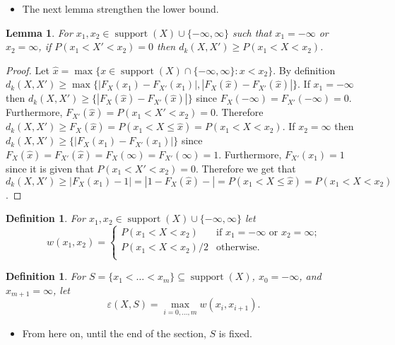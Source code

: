 \documentclass{article}
\newtheorem{lemma}[thm]{Lemma}
\newtheorem{definition}[thm]{Definition}
\DeclareMathOperator{\support}{support}
\begin{document}
\begin{itemize}
	\item The next lemma strengthen the lower bound.
\end{itemize}


\begin{lemma}\label{lem:geq2}
	For $x_1, x_2 \in \support(X) \cup \{-\infty,\infty\}$ such that $x_1=-\infty$ or  $x_2=\infty$, if $P(x_1 < X' < x_2)=0$  then 
	$d_k(X,X') \geq P(x_1 < X < x_2)$.
\end{lemma}
\begin{proof}
	Let $\hat x=\max \{x \in \support(X) \cap\{ -\infty, \infty\}  \colon x < x_2 \}$. By definition $d_k(X,X') \geq \max \{|F_X(x_1) - F_{X'}(x_1)|, |F_X(\hat x) - F_{X'}(\hat x)| \}$. If $x_1=-\infty$ then $d_k(X,X') \geq \{|F_X(\hat x) - F_{X'}(\hat x)| \}$ since $F_X(-\infty) = F_{X'}(-\infty) = 0$. Furthermore, $F_{X'}(\hat x) = P(x_1 < X' < x_2)=0$. Therefore $d_k(X,X') \geq F_X(\hat x) = P(x_1 < X \leq \hat x) = P(x_1 < X < x_2)$. 
	If $x_2=\infty$ then $d_k(X,X') \geq \{|F_X(x_1) - F_{X'}(x_1)| \}$ since $F_X(\hat{x}) = F_{X'}(\hat{x}) = F_X(\infty) = F_{X'}(\infty) = 1$. Furthermore, $F_{X'}(x_1) = 1$ since it is given that $P(x_1 < X' < x_2)=0$. Therefore we get that $d_k(X,X') \geq |F_X(x_1)-1| = |1-F_X(\hat x)-| = P(x_1 < X \leq \hat x) = P(x_1 < X < x_2)$.
\end{proof}


\begin{definition}\label{def:weight} For $x_1,x_2 \in \support(X) \cup \{-\infty,\infty\}$ let
	\[
	w(x_1,x_2)=
	\begin{cases}
		P(x_1 < X < x_2) & \text{if $x_1=-\infty$ or $x_2 = \infty$;} \\
		P(x_1 < X < x_2)/2 & \text{otherwise.} \\	
	\end{cases}
	\]
\end{definition} 


\begin{definition} For $S=\{x_1<\dots<x_m\} \subseteq \support(X)$, $x_0=-\infty$, and $x_{m+1}=\infty$, let
	\[
	\varepsilon(X,S) = \max\limits_{i=0,\dots,m} w(x_{i}, x_{i+1}).
	\]
\end{definition} 

\begin{itemize}
	\item From here on, until the end of the section, $S$ is fixed.
\end{itemize}
\end{document}
